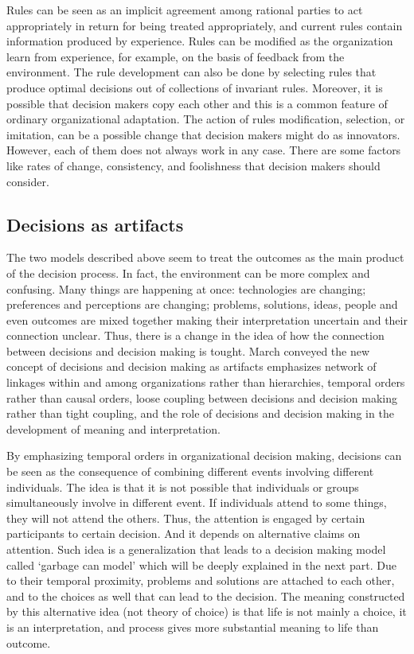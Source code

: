 Rules can be seen as an implicit agreement among rational parties to act appropriately in return for being treated appropriately, and current rules contain information produced by experience\cite{2}. Rules can be modified as the organization learn from experience, for example, on the basis of feedback from the environment. The rule development can also be done by selecting rules that produce optimal decisions out of collections of invariant rules. Moreover, it is possible that decision makers copy each other and this is a common feature of ordinary organizational adaptation. The action of rules modification, selection, or imitation, can be a possible change that decision makers might do as innovators. However, each of them does not always work in any case. There are some factors like rates of change, consistency, and foolishness that decision makers should consider.

\subsection{Decisions as artifacts}

The two models described above seem to treat the outcomes as the main product of the decision process. In fact, the environment can be more complex and confusing. Many things are happening at once: technologies are changing; preferences and perceptions are changing; problems, solutions, ideas, people and even outcomes are mixed together making their interpretation uncertain and their connection unclear\cite{2}. Thus, there is a change in the idea of how the connection between decisions and decision making is tought. March conveyed the new concept of decisions and decision making as artifacts emphasizes network of linkages within and among organizations rather than hierarchies, temporal orders rather than causal orders, loose coupling between decisions and decision making rather than tight coupling, and the role of decisions and decision making in the development of meaning and interpretation.

By emphasizing temporal orders in organizational decision making, decisions can be seen as the consequence of combining different events involving different individuals. The idea is that it is not possible that individuals or groups simultaneously involve in different event. If individuals attend to some things, they will not attend the others. Thus, the attention is engaged by certain participants to certain decision. And it depends on alternative claims on attention\cite{2}. Such idea is a generalization that leads to a decision making model called ‘garbage can model’ which will be deeply explained in the next part. Due to their temporal proximity, problems and solutions are attached to each other, and to the choices as well that can lead to the decision. The meaning constructed by this alternative idea (not theory of choice) is that life is not mainly a choice, it is an interpretation, and process gives more substantial meaning to life than outcome.

